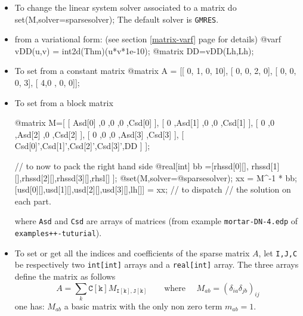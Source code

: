 \documentclass[a4paper,twoside,12pt]{book}
\begin{document}
\begin{itemize}
\item  To change the linear system solver associated to a matrix do 
\bFF
     set(M,solver=sparsesolver);
\eFF
The default solver is \texttt{GMRES}.
\item  from a variational form: (see  section \ref{matrix-varf}  page \pageref{matrix-varf} for details)
\bFF
@varf  vDD(u,v) = int2d(Thm)(u*v*1e-10);
@matrix DD=vDD(Lh,Lh);
\eFF
\item  To set  from  a constant matrix
\bFF
    @matrix A =
                [[ 0, 1, 0, 10],
                 [ 0,  0,  2, 0],
                 [ 0, 0, 0,  3],
                 [ 4,0 , 0, 0]];

\eFF
\item  To set from a block matrix  

\bFF
    @matrix M=[
               [ Asd[0] ,0      ,0      ,0      ,Csd[0] ],
               [ 0      ,Asd[1] ,0      ,0      ,Csd[1] ],
               [ 0      ,0      ,Asd[2] ,0      ,Csd[2] ],
               [ 0      ,0      ,0      ,Asd[3] ,Csd[3] ],
               [ Csd[0]',Csd[1]',Csd[2]',Csd[3]',DD     ]
 ];

   //  to now  to pack the right hand side
     @real[int] bb =[rhssd[0][], rhssd[1][],rhssd[2][],rhssd[3][],rhsl[] ];
     @set(M,solver=@sparsesolver);
     xx = M^-1 * bb;
     [usd[0][],usd[1][],usd[2][],usd[3][],lh[]] = xx; // to dispatch
     // the solution on each part.

\eFF
 where \texttt{Asd} and \texttt{Csd} are arrays of matrices (from example \verb!mortar-DN-4.edp! of \texttt{examples++-tuturial}).

\item  To set or get all the indices and coefficients of the sparse matrix $A$, let \verb!I,J,C! be respectively
  two \verb!int[int]! arrays and a  \verb!real[int]! array. The three arrays define
  the matrix  as follows
  $$
    A = \sum_k \mathtt{C[k]} M_{\mathtt{I[k],J[k]}} \qquad \mbox{where }\quad M_{ab} = ( \delta_{ia}\delta_{jb} )_{ij}
  $$
one has:  $ M_{ab}$  a basic matrix with the only  non zero term $m_{ab}=1$.


\end{itemize}
\end{document}
